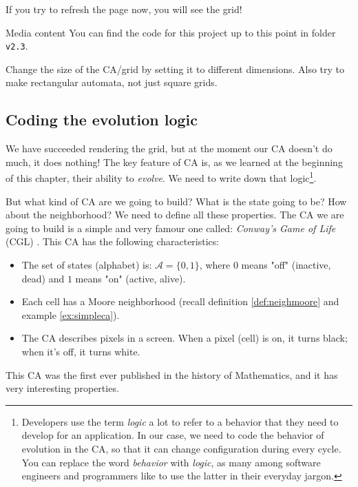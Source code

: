 If you try to refresh the page now, you will see the grid!

\begin{trailer}{Media content}
You can find the code for this project up to this point in folder \texttt{v2.3}.
\end{trailer}

\begin{problem}
\label{prob:changecasize}
Change the size of the CA/grid by setting it to different dimensions. Also try to make rectangular
automata, not just square grids.
\end{problem}

\subsection{Coding the evolution logic}
We have succeeded rendering the grid, but at the moment our CA doesn't do much, it does nothing!
The key feature of CA is, as we learned at the beginning of this chapter, their ability to
\textit{evolve}. We need to write down that
logic\footnote{Developers use the term \textit{logic} a lot to refer to a behavior that they need
to develop for an application. In our case, we need to code the behavior of evolution in the CA,
so that it can change configuration during every cycle. You can replace the word
\textit{behavior} with \textit{logic}, as many among software engineers and programmers like to
use the latter in their everyday jargon.}.

But what kind of CA are we going to build? What is the state going to be? How about the neighborhood? We
need to define all these properties. The CA we are going to build is a simple and very famour one called:
\textit{Conway's Game of Life} (CGL) \cite{wolfram-ca}.
This CA has the following characteristics:

\begin{itemize}
\item The set of states (alphabet) is: $\mathcal{A} = \{ 0, 1 \}$, where $0$ means "off" (inactive, dead) and
$1$ means "on" (active, alive).
\item Each cell has a Moore neighborhood (recall definition \ref{def:neighmoore} and example \ref{ex:simpleca}).
\item The CA describes pixels in a screen. When a pixel (cell) is on, it turns black; when it's off, it
turns white. 
\end{itemize}

This CA was the first ever published in the history of Mathematics, and it has very interesting properties.

